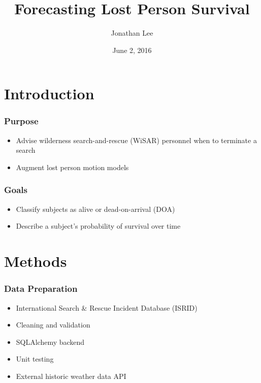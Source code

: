\documentclass[serif,final,bigger]{beamer}
\title{Forecasting Lost Person Survival}
\author{Jonathan Lee}
\institute{TJHSST Computer Systems Lab}
\date{June 2, 2016}
\begin{document}
  \begin{frame}
    \titlepage
  \end{frame}
  \usebackgroundtemplate{}

  \section{Introduction}

  \begin{frame}
    \frametitle{Purpose}
    \begin{itemize}
      \item Advise wilderness search-and-rescue (WiSAR) personnel when to terminate a search
      \item Augment lost person motion models
    \end{itemize}
  \end{frame}

  \begin{frame}
    \frametitle{Goals}
    \begin{itemize}
      \item Classify subjects as alive or dead-on-arrival (DOA)
      \item Describe a subject's probability of survival over time
    \end{itemize}
  \end{frame}

  \section{Methods}

  \begin{frame}
    \frametitle{Data Preparation}
    \begin{itemize}
      \item International Search \& Rescue Incident Database (ISRID)
      \item Cleaning and validation
      \item SQLAlchemy backend
      \item Unit testing
      \item External historic weather data API
    \end{itemize}
  \end{frame}
\end{document}
